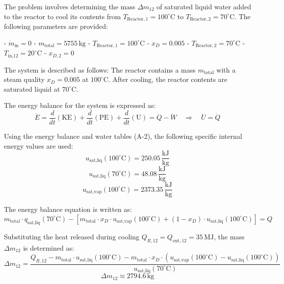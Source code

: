 The problem involves determining the mass \( \Delta m_{12} \) of saturated liquid water added to the reactor to cool its contents from \( T_{\text{Reactor},1} = 100^\circ\text{C} \) to \( T_{\text{Reactor},2} = 70^\circ\text{C} \). The following parameters are provided:  

- \( \dot{m}_{\text{in}} = 0 \)  
- \( m_{\text{total}} = 5755 \, \text{kg} \)  
- \( T_{\text{Reactor},1} = 100^\circ\text{C} \)  
- \( x_D = 0.005 \)  
- \( T_{\text{Reactor},2} = 70^\circ\text{C} \)  
- \( T_{\text{in,12}} = 20^\circ\text{C} \)  
- \( x_{D,2} = 0 \)  

The system is described as follows:  
The reactor contains a mass \( m_{\text{total}} \) with a steam quality \( x_D = 0.005 \) at \( 100^\circ\text{C} \). After cooling, the reactor contents are saturated liquid at \( 70^\circ\text{C} \).  

The energy balance for the system is expressed as:  
\[
\dot{E} = \frac{d}{dt} (\text{KE}) + \frac{d}{dt} (\text{PE}) + \frac{d}{dt} (\text{U}) = \dot{Q} - \dot{W} \quad \Rightarrow \quad \dot{U} = \dot{Q}
\]  

Using the energy balance and water tables (A-2), the following specific internal energy values are used:  
\[
u_{\text{sat,liq}}(100^\circ\text{C}) = 250.05 \, \frac{\text{kJ}}{\text{kg}}
\]  
\[
u_{\text{sat,liq}}(70^\circ\text{C}) = 48.08 \, \frac{\text{kJ}}{\text{kg}}
\]  
\[
u_{\text{sat,vap}}(100^\circ\text{C}) = 2373.35 \, \frac{\text{kJ}}{\text{kg}}
\]  

The energy balance equation is written as:  
\[
m_{\text{total}} \cdot q_{\text{sat,liq}}(70^\circ\text{C}) - \left[ m_{\text{total}} \cdot x_D \cdot u_{\text{sat,vap}}(100^\circ\text{C}) + (1 - x_D) \cdot u_{\text{sat,liq}}(100^\circ\text{C}) \right] = Q
\]  

Substituting the heat released during cooling \( Q_{R,12} = Q_{\text{out},12} = 35 \, \text{MJ} \), the mass \( \Delta m_{12} \) is determined as:  
\[
\Delta m_{12} = \frac{Q_{R,12} - m_{\text{total}} \cdot u_{\text{sat,liq}}(100^\circ\text{C}) - m_{\text{total}} \cdot x_D \cdot (u_{\text{sat,vap}}(100^\circ\text{C}) - u_{\text{sat,liq}}(100^\circ\text{C}))}{u_{\text{sat,liq}}(70^\circ\text{C})}
\]  
\[
\Delta m_{12} \approx 2794.6 \, \text{kg}
\]